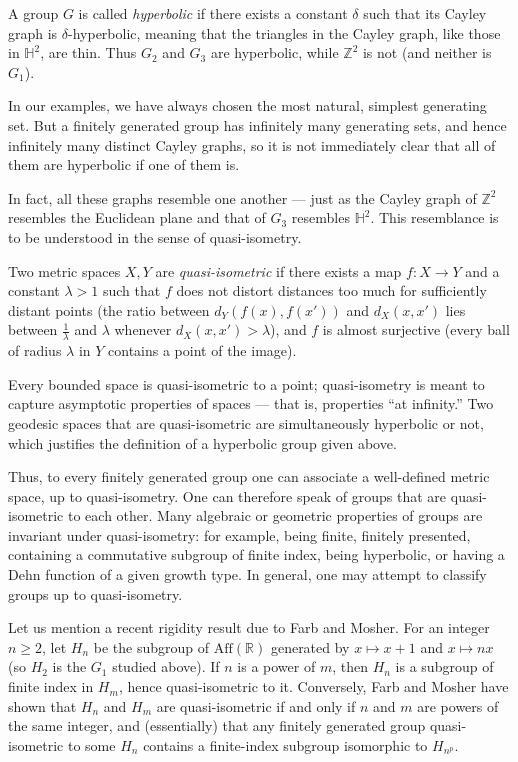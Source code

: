 \documentclass{amsart}
\begin{document}
A group $G$ is called \textit{hyperbolic} if there exists a constant $\delta$
such that its Cayley graph is $\delta$-hyperbolic, meaning that the
triangles in the Cayley graph, like those in $\mathbb{H}^2$, are
thin. Thus $G_2$ and $G_3$ are hyperbolic, while $\mathbb{Z}^2$ is not
(and neither is $G_1$).

In our examples, we have always chosen the most natural, simplest
generating set. But a finitely generated group has infinitely many
generating sets, and hence infinitely many distinct Cayley graphs, so
it is not immediately clear that all of them are hyperbolic if one of
them is.

In fact, all these graphs resemble one another --- just as the Cayley
graph of $\mathbb{Z}^2$ resembles the Euclidean plane and that of
$G_3$ resembles $\mathbb{H}^2$. This resemblance is to be understood
in the sense of quasi-isometry.

Two metric spaces $X, Y$ are \textit{quasi-isometric} if there exists a map
$f : X \to Y$ and a constant $\lambda > 1$ such that $f$ does not
distort distances too much for sufficiently distant points (the ratio
between $d_Y(f(x), f(x'))$ and $d_X(x, x')$ lies between
$\frac{1}{\lambda}$ and $\lambda$ whenever $d_X(x, x') > \lambda$),
and $f$ is almost surjective (every ball of radius $\lambda$ in $Y$
contains a point of the image).

Every bounded space is quasi-isometric to a point; quasi-isometry is
meant to capture asymptotic properties of spaces --- that is, properties
``at infinity.'' Two geodesic spaces that are quasi-isometric are
simultaneously hyperbolic or not, which justifies the definition of a
hyperbolic group given above.

Thus, to every finitely generated group one can associate a
well-defined metric space, up to quasi-isometry. One can therefore
speak of groups that are quasi-isometric to each other. Many algebraic
or geometric properties of groups are invariant under quasi-isometry:
for example, being finite, finitely presented, containing a
commutative subgroup of finite index, being hyperbolic, or having a
Dehn function of a given growth type. In general, one may attempt to
classify groups up to quasi-isometry.

Let us mention a recent rigidity result due to Farb and Mosher.%
For an integer $n \ge 2$, let $H_n$ be the subgroup of
$\mathrm{Aff}(\mathbb{R})$ generated by $x \mapsto x + 1$ and
$x \mapsto n x$ (so $H_2$ is the $G_1$ studied above). If $n$ is a
power of $m$, then $H_n$ is a subgroup of finite index in $H_m$, hence
quasi-isometric to it. Conversely, Farb and Mosher have shown that
$H_n$ and $H_m$ are quasi-isometric if and only if $n$ and $m$ are
powers of the same integer, and (essentially) that any finitely
generated group quasi-isometric to some $H_n$ contains a finite-index
subgroup isomorphic to $H_{n^p}$.
\end{document}
